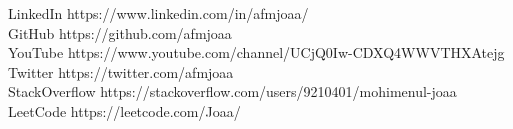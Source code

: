 
\horizontalLineLeft

\profileItem
    {\faLinkedin}
    {LinkedIn}
    {https://www.linkedin.com/in/afmjoaa/} \\
\profileItem
    {\faGithub}
    {GitHub}
    {https://github.com/afmjoaa} \\
\profileItem
    {\faYoutube}
    {YouTube}
    {https://www.youtube.com/channel/UCjQ0Iw-CDXQ4WWVTHXAtejg} \\
\profileItem
    {\faTwitter}
    {Twitter}
    {https://twitter.com/afmjoaa} \\
\profileItem
    {\faStackOverflow}
    {StackOverflow}
    {https://stackoverflow.com/users/9210401/mohimenul-joaa} \\
\profileItem
    {\faCode}
    {LeetCode}
    {https://leetcode.com/Joaa/}